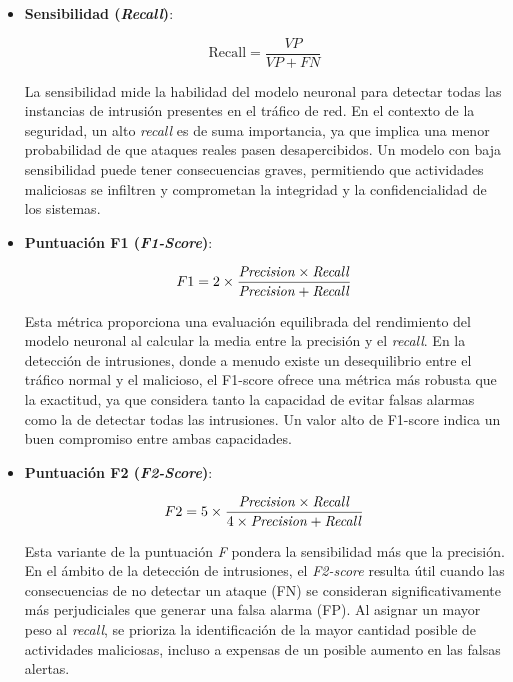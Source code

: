 \begin{itemize}
\item \textbf{Sensibilidad (\textit{Recall})}: \label{met:Recall}

\begin{equation}
    \text{Recall} = \frac{VP}{VP + FN}
\end{equation}

La sensibilidad mide la habilidad del modelo neuronal para detectar todas las instancias de intrusión presentes en el tráfico de red. En el contexto de la seguridad, un alto \textit{recall} es de suma importancia, ya que implica una menor probabilidad de que ataques reales pasen desapercibidos. Un modelo con baja sensibilidad puede tener consecuencias graves, permitiendo que actividades maliciosas se infiltren y comprometan la integridad y la confidencialidad de los sistemas.

\item \textbf{Puntuación F1 (\textit{F1-Score})}: \label{met:F1-score}

\begin{equation}
    F1 = 2 \times \frac{\text{\textit{Precision}} \times \text{\textit{Recall}}}{\text{\textit{Precision}} + \text{\textit{Recall}}}
\end{equation}

Esta métrica proporciona una evaluación equilibrada del rendimiento del modelo neuronal al calcular la media entre la precisión y el \textit{recall}. En la detección de intrusiones, donde a menudo existe un desequilibrio entre el tráfico normal y el malicioso, el F1-score ofrece una métrica más robusta que la exactitud, ya que considera tanto la capacidad de evitar falsas alarmas como la de detectar todas las intrusiones. Un valor alto de F1-score indica un buen compromiso entre ambas capacidades.

\item \textbf{Puntuación F2 (\textit{F2-Score})}: \label{met:F2-score}

\begin{equation}
    F2 = 5 \times \frac{\text{\textit{Precision}} \times \text{\textit{Recall}}}{4 \times \text{\textit{Precision}} + \text{\textit{Recall}}}
\end{equation}

Esta variante de la puntuación \textit{F} pondera la sensibilidad más que la precisión. En el ámbito de la detección de intrusiones, el \textit{F2-score} resulta útil cuando las consecuencias de no detectar un ataque (FN) se consideran significativamente más perjudiciales que generar una falsa alarma (FP). Al asignar un mayor peso al \textit{recall}, se prioriza la identificación de la mayor cantidad posible de actividades maliciosas, incluso a expensas de un posible aumento en las falsas alertas.



\end{itemize}
